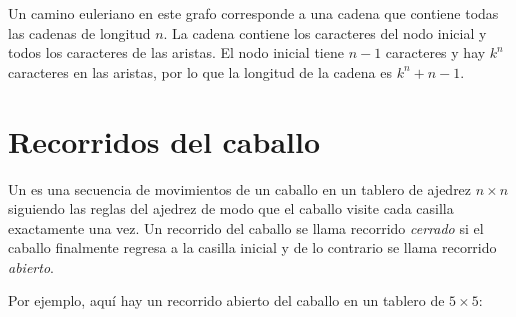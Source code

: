 \begin{center}
\end{center}

Un camino euleriano en este grafo corresponde a una cadena
que contiene todas las cadenas de longitud $n$.
La cadena contiene los caracteres del nodo inicial
y todos los caracteres de las aristas.
El nodo inicial tiene $n-1$ caracteres
y hay $k^n$ caracteres en las aristas,
por lo que la longitud de la cadena es $k^n+n-1$.

\section{Recorridos del caballo}


Un  es una secuencia de movimientos
de un caballo en un tablero de ajedrez $n \times n$
siguiendo las reglas del ajedrez de modo que el caballo
visite cada casilla exactamente una vez.
Un recorrido del caballo se llama recorrido \emph{cerrado}
si el caballo finalmente regresa a la casilla inicial y
de lo contrario se llama recorrido \emph{abierto}.

Por ejemplo, aquí hay un recorrido abierto del caballo en un tablero de $5 \times 5$:

